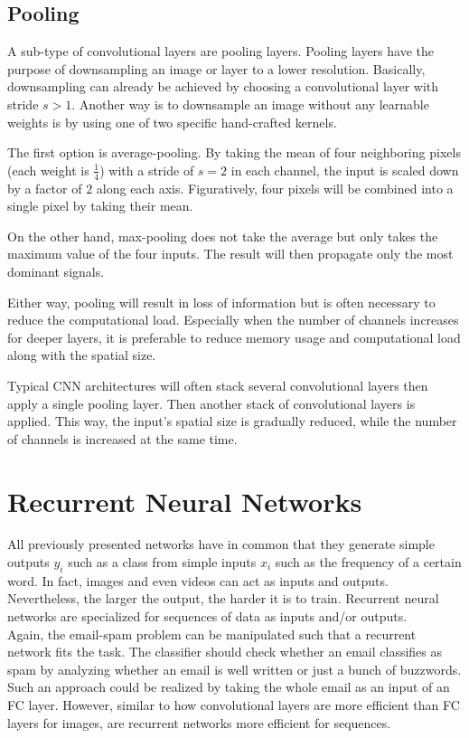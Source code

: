 \subsection{Pooling}
A sub-type of convolutional layers are pooling layers.
Pooling layers have the purpose of downsampling an image or layer to a lower resolution.
Basically, downsampling can already be achieved by choosing a convolutional layer with stride $s > 1$.
Another way is to downsample an image without any learnable weights is by using one of two specific hand-crafted kernels.

The first option is average-pooling.
By taking the mean of four neighboring pixels (each weight is $\frac{1}{4}$) with a stride of $s = 2$ in each channel, the input is scaled down by a factor of $2$ along each axis.
Figuratively, four pixels will be combined into a single pixel by taking their mean.

On the other hand, max-pooling does not take the average but only takes the maximum value of the four inputs.
The result will then propagate only the most dominant signals.

Either way, pooling will result in loss of information but is often necessary to reduce the computational load.
Especially when the number of channels increases for deeper layers, it is preferable to reduce memory usage and computational load along with the spatial size.

Typical CNN architectures will often stack several convolutional layers then apply a single pooling layer.
Then another stack of convolutional layers is applied.
This way, the input's spatial size is gradually reduced, while the number of channels is increased at the same time.

\section{Recurrent Neural Networks}
All previously presented networks have in common that they generate simple outputs $y_i$ such as a class from simple inputs $x_i$ such as the frequency of a certain word.
In fact, images and even videos can act as inputs and outputs.
Nevertheless, the larger the output, the harder it is to train.
Recurrent neural networks are specialized for sequences of data as inputs and/or outputs.\\
Again, the email-spam problem can be manipulated such that a recurrent network fits the task.
The classifier should check whether an email classifies as spam by analyzing whether an email is well written or just a bunch of buzzwords.
Such an approach could be realized by taking the whole email as an input of an FC layer.
However, similar to how convolutional layers are more efficient than FC layers for images, are recurrent networks more efficient for sequences.

